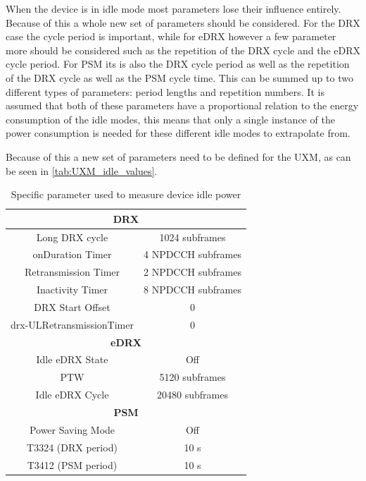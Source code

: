 When the device is in idle mode most parameters lose their influence entirely. Because of this a whole new set of parameters should be considered. For the \gls{DRX} case the cycle period is important, while for \gls{eDRX} however a few parameter more should be considered such as the repetition of the DRX cycle and the eDRX cycle period. For \gls{PSM} its is also the DRX cycle period as well as the repetition of the DRX cycle as well as the PSM cycle time. This can be summed up to two different types of parameters: period lengths and repetition numbers. It is assumed that both of these parameters have a proportional relation to the energy consumption of the idle modes, this means that only a single instance of the power consumption is needed for these different idle modes to extrapolate from.

Because of this a new set of parameters need to be defined for the UXM, as can be seen in \autoref{tab:UXM_idle_values}.

\begin{table}[H]
\centering
\begin{tabular}{|c|c|} \hline
\multicolumn{2}{|c|}{\textbf{DRX}}  	 \\ \hline
Long DRX cycle     	& 1024 subframes 	 \\ \hline
onDuration Timer   	& 4 NPDCCH subframes \\ \hline
Retransmission Timer & 2 NPDCCH subframes \\ \hline
Inactivity Timer   	& 8 NPDCCH subframes \\ \hline
DRX Start Offset   	& 0              	 \\ \hline
drx-ULRetransmissionTimer & 0       	 \\ \hline
\multicolumn{2}{|c|}{\textbf{eDRX}} 	 \\ \hline
Idle eDRX State		& Off				 \\ \hline
\gls{PTW}			& 5120 subframes 	 \\ \hline
Idle eDRX Cycle     & 20480 subframes	 \\ \hline
\multicolumn{2}{|c|}{\textbf{PSM}}  	 \\ \hline
Power Saving Mode	& Off				 \\ \hline
T3324 (DRX period)	& 10 s    			 \\ \hline
T3412 (PSM period)	& 10 s		  		 \\ \hline
\end{tabular}
\caption{Specific parameter used to measure device idle power}
\label{tab:UXM_idle_values}
\end{table}


